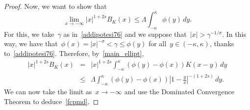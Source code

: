 \documentclass[10pt,a4paper]{amsart}
\numberwithin{equation}{section}
\begin{document}
\begin{proof}
Now, we want to show that
\begin{equation}\label{fcpmd}
\lim_{x \to - \infty} |x |^{1+2s} B_K(x) \leq  \Lambda \int_{-\kappa}^{\kappa} \phi(y)\, dy.
\end{equation}
For this, we take~$\gamma$ as in~\eqref{addipotesi76}
and we suppose that~$|x|>\gamma^{-1/\sigma}$.
In this way, we have that~$\phi(x)=|x|^{-\sigma}<\gamma\le\phi(y)$
for all~$y\in(-\kappa,\kappa)$,
thanks to~\eqref{addipotesi76}.
Therefore, by~\eqref{main_ellipt},
\begin{eqnarray*}
|x|^{1+2s}B_K(x)&=& |x|^{1+2s}
\int_{-\kappa}^{\kappa} \left( \phi(y) -\phi(x)\right) K(x-y) \, dy\\
&\le& \Lambda \int_{-\kappa}^{\kappa} \left( \phi(y)-\phi(x) \right) \left| 1 -\frac{y}{x} \right|^{-(1+2s)}\, dy.
\end{eqnarray*}
We can now take the limit as~$x\to-\infty$ and use the
Dominated Convergence Theorem to deduce~\eqref{fcpmd}.


\end{proof}
\end{document}
